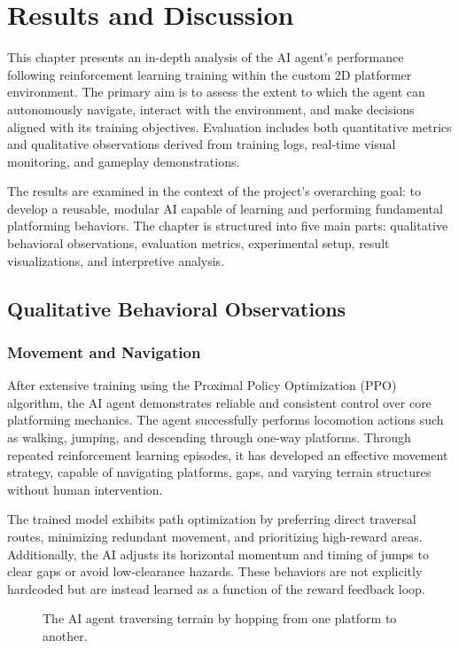 \documentclass[12pt,oneside,openright,a4paper]{cpe-english-project}
\begin{document}
\chapter{Results and Discussion}
This chapter presents an in-depth analysis of the AI agent’s performance following reinforcement learning training within the custom 2D platformer environment. The primary aim is to assess the extent to which the agent can autonomously navigate, interact with the environment, and make decisions aligned with its training objectives. Evaluation includes both quantitative metrics and qualitative observations derived from training logs, real-time visual monitoring, and gameplay demonstrations.

The results are examined in the context of the project’s overarching goal: to develop a reusable, modular AI capable of learning and performing fundamental platforming behaviors. The chapter is structured into five main parts: qualitative behavioral observations, evaluation metrics, experimental setup, result visualizations, and interpretive analysis.

\section{Qualitative Behavioral Observations}
\subsection{Movement and Navigation}

After extensive training using the Proximal Policy Optimization (PPO) algorithm, the AI agent demonstrates reliable and consistent control over core platforming mechanics. The agent successfully performs locomotion actions such as walking, jumping, and descending through one-way platforms. Through repeated reinforcement learning episodes, it has developed an effective movement strategy, capable of navigating platforms, gaps, and varying terrain structures without human intervention.

The trained model exhibits path optimization by preferring direct traversal routes, minimizing redundant movement, and prioritizing high-reward areas. Additionally, the AI adjusts its horizontal momentum and timing of jumps to clear gaps or avoid low-clearance hazards. These behaviors are not explicitly hardcoded but are instead learned as a function of the reward feedback loop.

\begin{figure}[H]
\centering
{}
\caption{The AI agent traversing terrain by hopping from one platform to another.}
\label{fig:AIJump}
\end{figure}
\end{document}

